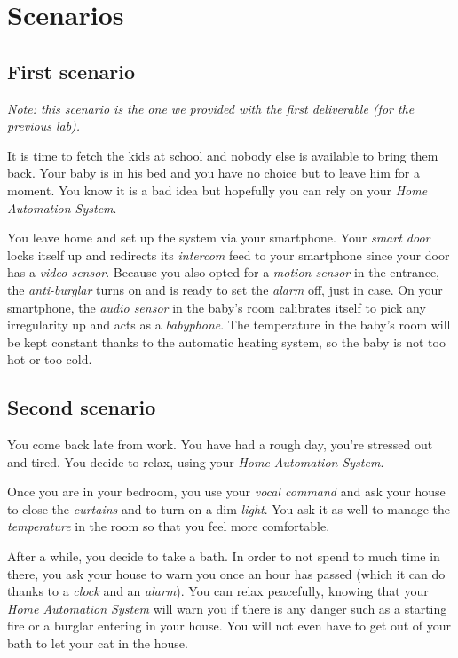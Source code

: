	\section{Scenarios}
		\subsection{First scenario}
			\textit{Note: this scenario is the one we provided with the first deliverable (for the previous lab).}
			
			It is time to fetch the kids at school and nobody else is available to bring them back. Your baby is in his bed and you have no choice but to leave him for a moment. You know it is a bad idea but hopefully you can rely on your \emph{Home Automation System}.

      		You leave home and set up the system via your smartphone.
      		Your \emph{smart door} locks itself up and redirects its \emph{intercom} feed to your smartphone since your door has a \emph{video sensor}. Because you also opted for a \emph{motion sensor} in the entrance, the \emph{anti-burglar} turns on and is ready to set the \emph{alarm} off, just in case.
      		On your smartphone, the \emph{audio sensor} in the baby's room calibrates itself to pick any irregularity up and acts as a \emph{babyphone}. The temperature in the baby's room will be kept constant thanks to the automatic heating system, so the baby is not too hot or too cold.
		
		\subsection{Second scenario}
			You come back late from work. You have had a rough day, you're stressed out and tired. You decide to relax, using your \emph{Home Automation System}.
			
			Once you are in your bedroom, you use your \emph{vocal command} and ask your house to close the \emph{curtains} and to turn on a dim \emph{light}. You ask it as well to manage the \emph{temperature} in the room so that you feel more comfortable.
			
			After a while, you decide to take a bath. In order to not spend to much time in there, you ask your house to warn you once an hour has passed (which it can do thanks to a \emph{clock} and an \emph{alarm}).
			You can relax peacefully, knowing that your \emph{Home Automation System} will warn you if there is any danger such as a starting fire or a burglar entering in your house. You will not even have to get out of your bath to let your cat in the house.
			
